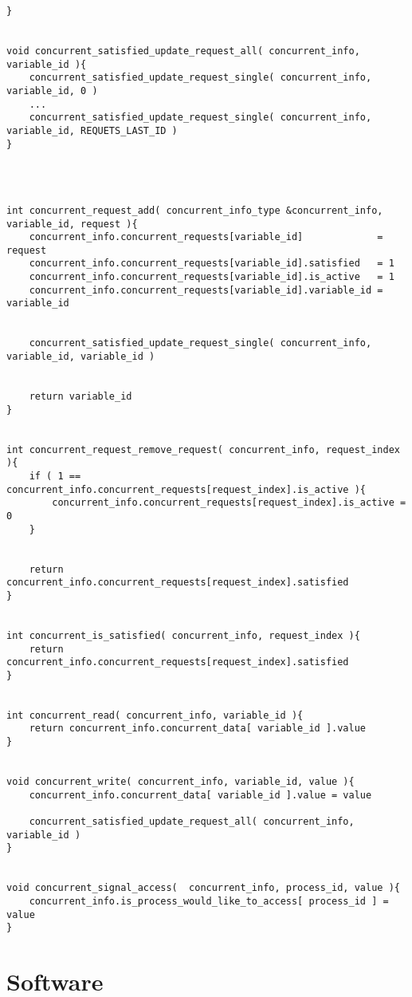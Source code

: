 \begin{lstlisting}[style=styleuppaal]
}


void concurrent_satisfied_update_request_all( concurrent_info, variable_id ){
    concurrent_satisfied_update_request_single( concurrent_info, variable_id, 0 )
    ...
    concurrent_satisfied_update_request_single( concurrent_info, variable_id, REQUETS_LAST_ID )
}




int concurrent_request_add( concurrent_info_type &concurrent_info, variable_id, request ){
    concurrent_info.concurrent_requests[variable_id]             = request
    concurrent_info.concurrent_requests[variable_id].satisfied   = 1
    concurrent_info.concurrent_requests[variable_id].is_active   = 1
    concurrent_info.concurrent_requests[variable_id].variable_id = variable_id


    concurrent_satisfied_update_request_single( concurrent_info, variable_id, variable_id )


    return variable_id
}


int concurrent_request_remove_request( concurrent_info, request_index ){
    if ( 1 == concurrent_info.concurrent_requests[request_index].is_active ){
        concurrent_info.concurrent_requests[request_index].is_active = 0
    }


    return concurrent_info.concurrent_requests[request_index].satisfied
}


int concurrent_is_satisfied( concurrent_info, request_index ){
    return concurrent_info.concurrent_requests[request_index].satisfied
}


int concurrent_read( concurrent_info, variable_id ){
    return concurrent_info.concurrent_data[ variable_id ].value
}


void concurrent_write( concurrent_info, variable_id, value ){
    concurrent_info.concurrent_data[ variable_id ].value = value
    
    concurrent_satisfied_update_request_all( concurrent_info, variable_id )
}


void concurrent_signal_access(  concurrent_info, process_id, value ){
    concurrent_info.is_process_would_like_to_access[ process_id ] = value
}
	\end{lstlisting}
\chapter{  Software }\label{Appendix_2} 
